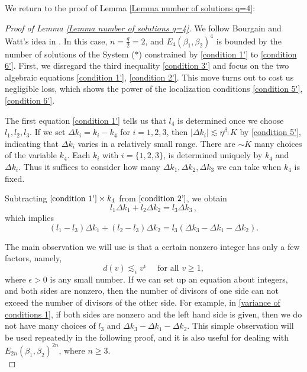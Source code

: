 \documentclass[11pt]{amsart}
\numberwithin{equation}{section}
\theoremstyle{definition}
\theoremstyle{proposition}
\begin{document}
We return to the proof of Lemma \ref{Lemma number of solutions q=4}:
\begin{proof} [Proof of Lemma \ref{Lemma number of solutions q=4}]
We follow Bourgain and Watt's idea in \cite[Proposition 7]{BourgainWatt1st}. In this case, $n=\frac{q}{2}=2$, and $E_4(\beta_1,\beta_2)^4$ is bounded by the number of solutions of the System ($*$) constrained by \eqref{condition 1'} to \eqref{condition 6'}. First, we disregard the third inequality \eqref{condition 3'} and focus on the two algebraic equations \eqref{condition 1'}, \eqref{condition 2'}. This move turns out to cost us negligible loss, which shows the power of the localization conditions \eqref{condition 5'}, \eqref{condition 6'}. 

The first equation \eqref{condition 1'} tells us that $l_4$ is determined once we choose $l_1,l_2,l_3$. If we set $\Delta k_i=k_i-k_4$ for $i=1,2,3$, then $|\Delta k_i|\lesssim \eta^{\beta_1}K$ by \eqref{condition 5'}, indicating that 
$\Delta k_i$  varies in a relatively small range.  
There are $\sim K$ many choices of the variable $k_4$. Each $k_i$ with $i=\{1,2,3\}$, is determined uniquely by $k_4$ and $\Delta k_i$. Thus it suffices to consider how many $\Delta k_1, \Delta k_2,\Delta k_3$ we can take when $k_4$ is fixed. 

Subtracting $\eqref{condition 1'}\times k_4$ 
from $\eqref{condition 2'}$, we obtain 
\begin{equation}
 l_1\Delta k_1 + l_2\Delta k_2= l_3\Delta k_3\,,  
\end{equation}
which implies 
\begin{equation}     \label{variance of conditions 1}
 (l_1-l_3)\Delta k_1+(l_2-l_3)\Delta k_2=l_3(\Delta k_3-\Delta k_1-\Delta k_2).
\end{equation}

The main observation we will use is that a certain nonzero integer has only a few factors, namely,
\[
d(v)\lesssim_\epsilon v^\epsilon \quad \text{ for all } v\ge 1,
\]
where $\epsilon>0$ is any small number. If we can set up an equation about integers, and both sides are nonzero, then the number of divisors of one side can not exceed the number of divisors of the other side. For example, in \eqref{variance of conditions 1}, if both sides are nonzero and the left hand side is given, then we do not have many choices of $l_3$ and $\Delta k_3-\Delta k_1-\Delta k_2$. This simple observation will be used repeatedly in the following proof, and it is also useful for dealing with $E_{2n}(\beta_1,\beta_2)^{2n}$, where $n\ge 3$. \\



\end{proof}
\end{document}

